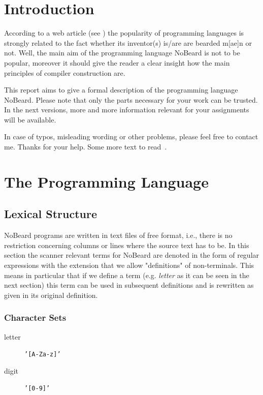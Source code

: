 \documentclass[11pt]{report}
\newcommand{\leongage}{NoBeard}
\begin{document}
\pagebreak

\tableofcontents
\chapter{Introduction}
According to a web article (see \cite{khason_computer_2008}) the popularity of programming languages is strongly related to the fact whether its inventor(s) is/are are bearded m[ae]n or not. Well, the main aim of the programming language \leongage{} is not to be popular,
moreover it should give the reader a clear insight how the main principles of compiler construction are.

This report aims to give a formal description of the programming language \leongage. Please note that only the parts
necessary for your work can be trusted. In the next versions, more and more information relevant for your assignments
will be available.

In case of typos, misleading wording or other problems, please feel free to contact me. Thanks for your help. Some more text to read~\cite{terry_compiling_2004}. 

\chapter{The Programming Language}
\section{Lexical Structure}

\leongage{} programs are written in text files of free format, i.e., there is no restriction concerning columns or lines where
the source text has to be. In this section the scanner relevant terms for \leongage{} are denoted in the form of regular expressions
with the extension that we allow "definitions" of non-terminals. This means in particular that if we define a term (e.g.
{\em letter} as it can be seen in the next section) this term can be used in subsequent definitions and is rewritten as
given in its original definition.

\subsection{Character Sets}
\begin{description}
	\item[letter] \texttt{'[A-Za-z]'}
	\item[digit]\texttt{'[0-9]'}
\end{description}
\end{document}
